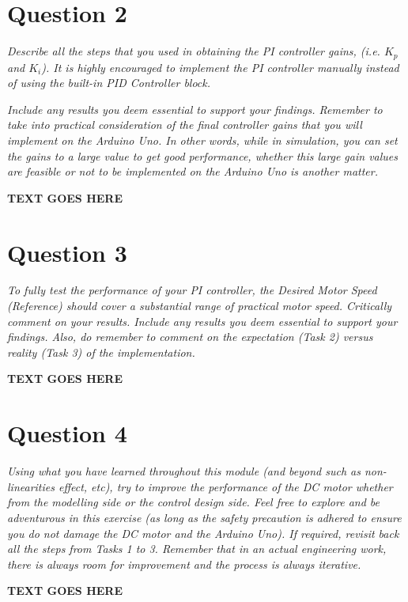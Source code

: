 \documentclass[11pt, onecolumn]{article}
\begin{document}
\section*{Question 2}
\par \textit{Describe all the steps that you used in obtaining the PI controller gains, (i.e. $K_p$ and $K_i$). It is highly encouraged to implement the PI controller manually instead of using the built-in PID Controller block.}
\par \textit{Include any results you deem essential to support your findings. Remember to take into practical consideration of the final controller gains that you will implement on the Arduino Uno. In other words, while in simulation, you can set the gains to a large value to get good performance, whether this large gain values are feasible or not to be implemented on the Arduino Uno is another matter.}
\noindent\makebox[\linewidth]{\rule{\textwidth}{0.4pt}}
\par \textbf{TEXT GOES HERE}
\section*{Question 3}
\par \textit{To fully test the performance of your PI controller, the Desired Motor Speed (Reference) should cover a substantial range of practical motor speed. Critically comment on your results. Include any results you deem essential to support your findings. Also, do remember to comment on the expectation (Task 2) versus reality (Task 3) of the implementation.}
\noindent\makebox[\linewidth]{\rule{\textwidth}{0.4pt}}
\par \textbf{TEXT GOES HERE}
\section*{Question 4}
\par \textit{Using what you have learned throughout this module (and beyond such as non- linearities effect, etc), try to improve the performance of the DC motor whether from the modelling side or the control design side. Feel free to explore and be adventurous in this exercise (as long as the safety precaution is adhered to ensure you do not damage the DC motor and the Arduino Uno). If required, revisit back all the steps from Tasks 1 to 3. Remember that in an actual engineering work, there is always room for improvement and the process is always iterative.}
\noindent\makebox[\linewidth]{\rule{\textwidth}{0.4pt}}
\par \textbf{TEXT GOES HERE}


\end{document}
